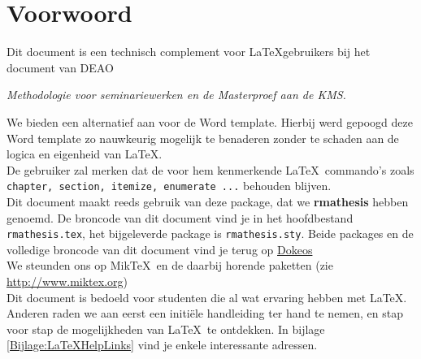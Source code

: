 \chapter*{Voorwoord}
\thispagestyle{empty}
Dit document is een technisch complement voor \LaTeX gebruikers bij het document van DEAO 
\begin{center}
{\em Methodologie voor seminariewerken en de Masterproef aan de KMS.}
\end{center}
We bieden een alternatief aan voor de Word template. Hierbij werd gepoogd deze Word template zo nauwkeurig mogelijk te benaderen zonder te schaden aan de logica en eigenheid van \LaTeX.\\

De gebruiker zal merken dat de voor hem kenmerkende \LaTeX\ commando's zoals \texttt{chapter, section, itemize, enumerate ...} behouden blijven.\\[2ex]
Dit document maakt reeds gebruik van deze package, dat we \textbf{rmathesis} hebben genoemd. De broncode van dit document vind je in het hoofdbestand \texttt{rmathesis.tex}, het bijgeleverde package is  \texttt{rmathesis.sty}. Beide packages en de volledige broncode van dit document vind je terug op \url{Dokeos}\\[2ex]
We steunden ons op Mik\TeX\ en de daarbij horende paketten (zie \url{http://www.miktex.org})\\
Dit document is bedoeld voor studenten die al wat ervaring hebben
met \LaTeX. Anderen raden we aan eerst een initi\"ele handleiding ter
hand te nemen, en stap voor stap de mogelijkheden van \LaTeX\ te
ontdekken. In bijlage \ref{Bijlage:LaTeXHelpLinks} vind je enkele
interessante adressen.